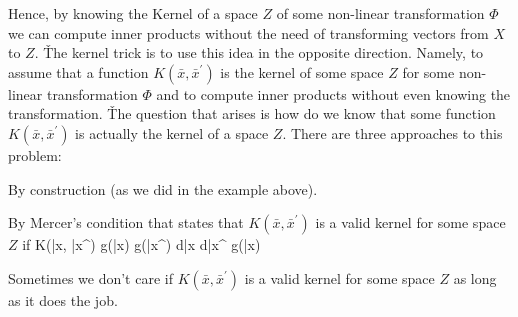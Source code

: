 Hence, by knowing the Kernel of a space $Z$ of some non-linear transformation $\Phi$ we can compute inner products
without the need of transforming vectors from $X$ to $Z$. \v

The kernel trick is to use this idea in the opposite direction. Namely, to assume that a function $K(\bar{x},
\bar{x}^\prime)$ is the kernel of some space $Z$ for some non-linear transformation $\Phi$ and to compute inner
products without even knowing the transformation. \v

The question that arises is how do we know that some function $K(\bar{x}, \bar{x}^\prime)$ is actually the kernel of
a space $Z$. There are three approaches to this problem:
\ben
\item By construction (as we did in the example above).
\item By Mercer's condition that states that $K(\bar{x}, \bar{x}^\prime)$ is a valid kernel for some space $Z$ if
\bse
\int K(\bar{x}, \bar{x}^\prime) g(\bar{x}) g(\bar{x}^\prime) d\bar{x} d\bar{x}^\prime {} \:\:\: \forall \:\:\:
 \:\:\: g(\bar{x})
\ese

\item Sometimes we don't care if $K(\bar{x}, \bar{x}^\prime)$ is a valid kernel for some space $Z$ as long as it does
the job.
\een